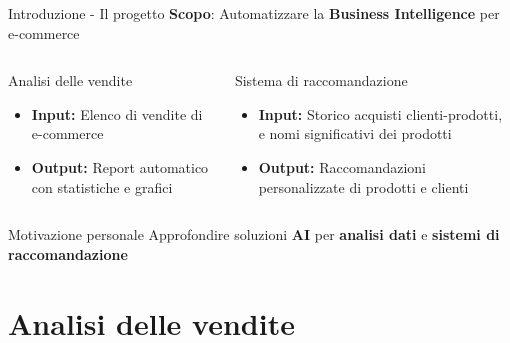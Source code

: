 \documentclass{beamer}
\begin{document}
	\begin{frame}{Introduzione - Il progetto}
		\textbf{Scopo}: Automatizzare la \textbf{Business Intelligence} per e-commerce

		\begin{columns}
			\begin{column}{0.5\textwidth}
				\begin{block}{Analisi delle vendite}
					\begin{itemize}
						\item \textbf{Input:} Elenco di vendite di e-commerce
						\item \textbf{Output:} Report automatico con statistiche e grafici
					\end{itemize}
				\end{block}
			\end{column}
			\begin{column}{0.5\textwidth}
				\begin{block}{Sistema di raccomandazione}
					\begin{itemize}
						\item \textbf{Input:} Storico acquisti clienti-prodotti, e nomi significativi dei prodotti
						\item \textbf{Output:} Raccomandazioni personalizzate di prodotti e clienti
					\end{itemize}
				\end{block}
			\end{column}
		\end{columns}

		\begin{alertblock}{Motivazione personale}
			Approfondire soluzioni \textbf{AI} per \textbf{analisi dati} e \textbf{sistemi di raccomandazione}
		\end{alertblock}
	\end{frame}


	\section{Analisi delle vendite}
\end{document}
